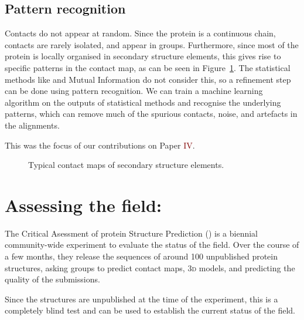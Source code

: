 \subsection{Pattern recognition}
Contacts do not appear at random.
Since the protein is a continuous chain, contacts are rarely isolated, and appear in groups.
Furthermore, since most of the protein is locally organised in secondary structure elements, this gives rise to specific patterns in the contact map, as can be seen in Figure~\ref{fig:contact_patterns}.
The statistical methods like \DCA{} and Mutual Information do not consider this, so a refinement step can be done using pattern recognition.
We can train a machine learning algorithm on the outputs of statistical methods and recognise the underlying patterns, which can remove much of the spurious contacts, noise, and artefacts in the alignments.

This was the focus of our contributions on Paper \textcolor{Maroon}{IV}.

\begin{figure}[!htb]
	\centering
	\hfil
	\hfil
	\hfil
	\caption{Typical contact maps of secondary structure elements.}\label{fig:contact_patterns}
\end{figure}



\section{Assessing the field: \CASP}
The Critical Asessment of protein Structure Prediction (\CASP) is a biennial community-wide experiment to evaluate the status of the field.
Over the course of a few months, they release the sequences of around 100 unpublished protein structures, asking groups to predict contact maps, 3\textsc{d} models, and predicting the quality of the submissions.

Since the structures are unpublished at the time of the experiment, this is a completely blind test and can be used to establish the current status of the field.
